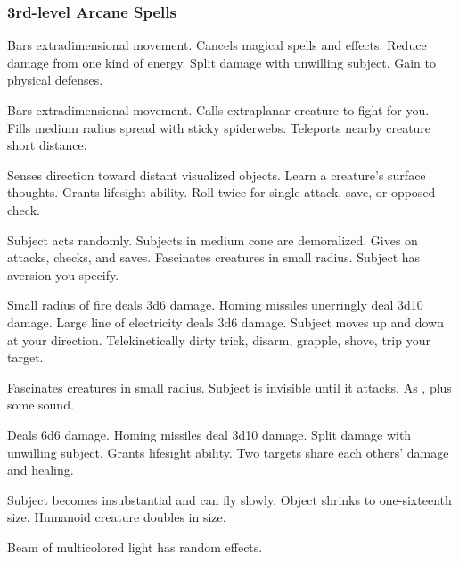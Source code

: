 \subsubsection{3rd-level Arcane Spells} 
\begin{swspelllist}
     Bars extradimensional movement.
     Cancels magical spells and effects.
     Reduce damage from one kind of energy.
     Split damage with unwilling subject.
     Gain  to physical defenses.

     Bars extradimensional movement.
     Calls extraplanar creature to fight for you.
     Fills medium radius spread with sticky spiderwebs.
     Teleports nearby creature short distance.

     Senses direction toward distant visualized objects.
     Learn a creature's surface thoughts.
     Grants lifesight ability.
     Roll twice for single attack, save, or opposed check.

     Subject acts randomly.
     Subjects in medium cone are demoralized.
     Gives  on attacks, checks, and saves.
     Fascinates creatures in small radius.
     Subject has aversion you specify.

     Small radius of fire deals 3d6 damage.
     Homing missiles unerringly deal 3d10 damage.
     Large line of electricity deals 3d6 damage.
     Subject moves up and down at your direction.
     Telekinetically dirty trick, disarm, grapple, shove, trip your target.

     Fascinates creatures in small radius.
     Subject is invisible until it attacks.
     As , plus some sound.

     Deals 6d6 damage.
     Homing missiles deal 3d10 damage.
     Split damage with unwilling subject.
     Grants lifesight ability.
     Two targets share each others' damage and healing.

     Subject becomes insubstantial and can fly slowly.
     Object shrinks to one-sixteenth size.
     Humanoid creature doubles in size.

     Beam of multicolored light has random effects.
\end{swspelllist}

